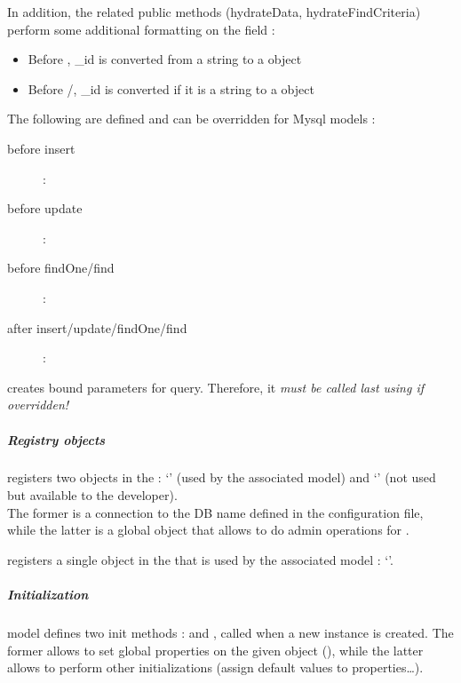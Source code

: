 \documentclass[pdftex,12pt,a4paper]{article}
\begin{document}
In addition, the related public methods (hydrateData, hydrateFindCriteria) perform some additional formatting on the  field :
\begin{itemize}
	\item Before , \_id is converted from a string to a  object
	\item Before /, \_id is converted if it is a string to a  object
\end{itemize}


The following are defined and can be overridden for Mysql models :
\begin{description}
	\item[before insert] : 
	\item[before update] : 
	\item[before findOne/find] : 
	\item[after insert/update/findOne/find] : 
\end{description}
\begin{note}
	 creates bound parameters for query. Therefore, it \emph{must be called last using  if overridden!}
\end{note}

\subparagraph{Registry objects}

  registers two objects in the  : `' (used by the associated model) and `' (not used but available to the developer).\\
The former is a connection to the DB name defined in the configuration file, while the latter is a global object that allows to do admin operations for .

  registers a single object in the  that is used by the associated model : `'.

\subparagraph{Initialization}

 model defines two init methods :  and , called when a new instance is created. The former allows to set global properties on the given  object (\eg {}), while the latter allows to perform other initializations (\eg assign default values to properties\ldots).
\end{document}
